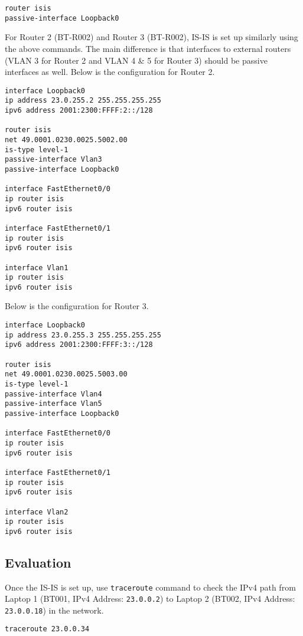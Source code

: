 \begin{lstlisting}
router isis
passive-interface Loopback0
\end{lstlisting}

For Router 2 (BT-R002) and Router 3 (BT-R002), IS-IS is set up similarly using the above commands. The main difference is that interfaces to external routers (VLAN 3 for Router 2 and VLAN 4 \& 5 for Router 3) should be passive interfaces as well. Below is the configuration for Router 2.

\begin{lstlisting}
interface Loopback0
ip address 23.0.255.2 255.255.255.255
ipv6 address 2001:2300:FFFF:2::/128

router isis
net 49.0001.0230.0025.5002.00
is-type level-1
passive-interface Vlan3
passive-interface Loopback0

interface FastEthernet0/0
ip router isis
ipv6 router isis

interface FastEthernet0/1
ip router isis
ipv6 router isis

interface Vlan1
ip router isis
ipv6 router isis
\end{lstlisting}

Below is the configuration for Router 3.

\begin{lstlisting}
interface Loopback0
ip address 23.0.255.3 255.255.255.255
ipv6 address 2001:2300:FFFF:3::/128

router isis
net 49.0001.0230.0025.5003.00
is-type level-1
passive-interface Vlan4
passive-interface Vlan5
passive-interface Loopback0

interface FastEthernet0/0
ip router isis
ipv6 router isis

interface FastEthernet0/1
ip router isis
ipv6 router isis

interface Vlan2
ip router isis
ipv6 router isis
\end{lstlisting}


\subsection{Evaluation}

Once the IS-IS is set up, use \texttt{traceroute} command to check the IPv4 path from Laptop 1 (BT001, IPv4 Address: \texttt{23.0.0.2}) to Laptop 2 (BT002, IPv4 Address: \texttt{23.0.0.18}) in the network.

\begin{lstlisting}[language=sh]
traceroute 23.0.0.34
\end{lstlisting}

